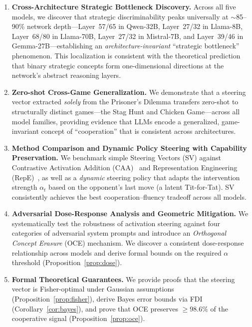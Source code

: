 \documentclass{article}
\begin{document}
\begin{enumerate}
    \item \textbf{Cross-Architecture Strategic Bottleneck Discovery.} Across all five models, we discover that strategic discriminability peaks universally at $\sim$85--90\% network depth---Layer~57/65 in Qwen-32B, Layer~27/32 in Llama-8B, Layer~68/80 in Llama-70B, Layer~27/32 in Mistral-7B, and Layer~39/46 in Gemma-27B---establishing an \textit{architecture-invariant} ``strategic bottleneck'' phenomenon. This localization is consistent with the theoretical prediction that binary strategic concepts form one-dimensional directions at the network's abstract reasoning layers.

    \item \textbf{Zero-shot Cross-Game Generalization.} We demonstrate that a steering vector extracted \textit{solely} from the Prisoner's Dilemma transfers zero-shot to structurally distinct games---the Stag Hunt and Chicken Game---across all model families, providing evidence that LLMs encode a generalized, game-invariant concept of ``cooperation'' that is consistent across architectures.

    \item \textbf{Method Comparison and Dynamic Policy Steering with Capability Preservation.} We benchmark simple Steering Vectors (SV) against Contrastive Activation Addition (CAA)~\citep{rimsky2023steering} and Representation Engineering (RepE)~\citep{zou2023representation}, as well as a \emph{dynamic} steering policy that adapts the intervention strength $\alpha_t$ based on the opponent's last move (a latent Tit-for-Tat). SV consistently achieves the best cooperation--fluency tradeoff across all models.

    \item \textbf{Adversarial Dose-Response Analysis and Geometric Mitigation.} We systematically test the robustness of activation steering against four categories of adversarial system prompts and introduce an \emph{Orthogonal Concept Erasure} (OCE) mechanism. We discover a consistent dose-response relationship across models and derive formal bounds on the required $\alpha$ threshold (Proposition~\ref{prop:dose}).

    \item \textbf{Formal Theoretical Guarantees.} We provide proofs that the steering vector is Fisher-optimal under Gaussian assumptions (Proposition~\ref{prop:fisher}), derive Bayes error bounds via FDI (Corollary~\ref{cor:bayes}), and prove that OCE preserves $\geq 98.6\%$ of the cooperative signal (Proposition~\ref{prop:oce}).
\end{enumerate}
\end{document}
